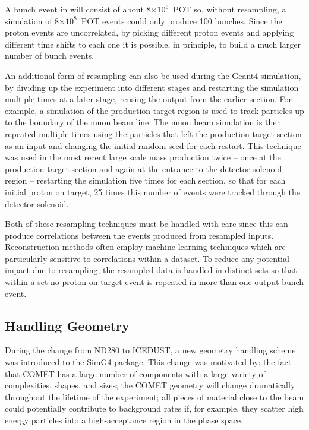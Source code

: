 A bunch event in \phaseI will consist of about 8$\times10^{6}$~\ac{POT} so, without resampling, a simulation of 8$\times10^{8}$~\ac{POT} events could only produce 100 bunches.
Since the proton events are uncorrelated, by picking different proton events and applying different time shifts to each one it is possible, in principle, to build a much larger number of bunch events.

An additional form of resampling can also be used during the Geant4 simulation, by dividing up the experiment into different stages and restarting the simulation multiple times at a later stage, reusing the output from the earlier section.
For example, a simulation of the production target region is used to track particles up to the boundary of the muon beam line.
The muon beam simulation is then repeated multiple times using the particles that left the production target section as an input and changing the initial random seed for each restart.
This technique was used in the most recent large scale mass production twice -- once at the production target section and again at the entrance to the detector solenoid region -- restarting the simulation five times for each section, so that for each initial proton on target, 25 times this number of events were tracked through the detector solenoid.

Both of these resampling techniques must be handled with care since this can produce correlations between the events produced from resampled inputs.
Reconstruction methods often employ machine learning techniques which are particularly sensitive to correlations within a dataset.
To reduce any potential impact due to resampling, the resampled data is handled in distinct sets so that within a set no proton on target event is repeated in more than one output bunch event.

\subsection{Handling Geometry}
During the change from ND280 to ICEDUST, a new geometry handling scheme was introduced to the SimG4 package.
This change was motivated by: 
    the fact that COMET has a large number of components with a large variety of complexities, shapes, and sizes;
    the COMET geometry will change dramatically throughout the lifetime of the experiment;
    all pieces of material close to the beam could potentially contribute to background rates if, for example, they scatter high energy particles into a high-acceptance region in the phase space.

